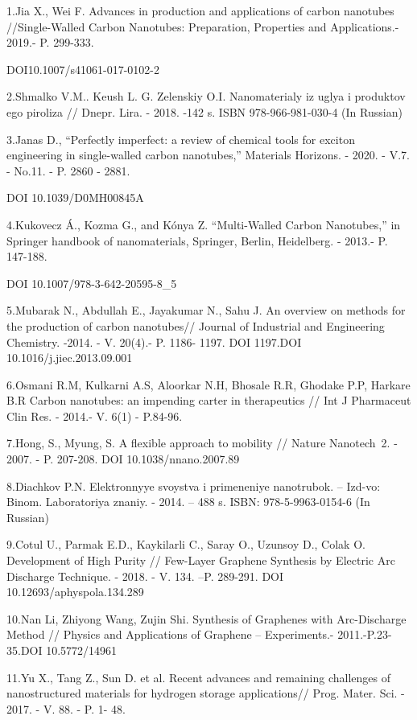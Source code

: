 \begin{noparindent}
1.Jia X., Wei F. Advances in production and applications of carbon
nanotubes //Single-Walled Carbon Nanotubes: Preparation, Properties and
Applications.- 2019.- P. 299-333.

DOI10.1007/s41061-017-0102-2

2.Shmalko V.M.. Keush L. G. Zelenskiy O.I. Nanomaterialy iz uglya i
produktov ego piroliza // Dnepr. Lira. - 2018. -142 s. ISBN
978-966-981-030-4 (In Russian)

3.Janas D., ``Perfectly imperfect: a review of chemical tools for
exciton engineering in single-walled carbon nanotubes,'' Materials
Horizons. - 2020. - V.7. - No.11. - P. 2860 - 2881.

DOI 10.1039/D0MH00845A

4.Kukovecz Á., Kozma G., and Kónya Z. ``Multi-Walled Carbon Nanotubes,''
in Springer handbook of nanomaterials, Springer, Berlin, Heidelberg. -
2013.- P. 147-188.

DOI 10.1007/978-3-642-20595-8\_5

5.Mubarak N., Abdullah E., Jayakumar N., Sahu J. An overview on methods
for the production of carbon nanotubes// Journal of Industrial and
Engineering Chemistry. -2014. - V. 20(4).- P. 1186- 1197. DOI 1197.DOI
10.1016/j.jiec.2013.09.001

6.Osmani R.M, Kulkarni A.S, Aloorkar N.H, Bhosale R.R, Ghodake P.P,
Harkare B.R Carbon nanotubes: an impending carter in therapeutics // Int
J Pharmaceut Clin Res. - 2014.- V. 6(1) - P.84-96.

7.Hong, S., Myung, S. A flexible approach to mobility // Nature
Nanotech~2. - 2007. - P. 207-208. DOI 10.1038/nnano.2007.89

8.Diachkov P.N. Elektronnyye svoystva i primeneniye nanotrubok. --
Izd-vo: Binom. Laboratoriya znaniy. - 2014. -- 488 s. ISBN:
978-5-9963-0154-6 (In Russian)

9.Cotul U., Parmak E.D., Kaykilarli C., Saray O., Uzunsoy D., Colak O.
Development of High Purity // Few-Layer Graphene Synthesis by Electric
Arc Discharge Technique. - 2018. - V. 134. --P. 289-291. DOI
10.12693/aphyspola.134.289

10.Nan Li, Zhiyong Wang, Zujin Shi. Synthesis of Graphenes with
Arc-Discharge Method // Physics and Applications of Graphene --
Experiments.- 2011.-P.23-35.DOI 10.5772/14961

11.Yu X., Tang Z., Sun D. et al. Recent advances and remaining
challenges of nanostructured materials for hydrogen storage
applications// Prog. Mater. Sci. - 2017. - V. 88. - P. 1- 48.


\end{noparindent}

